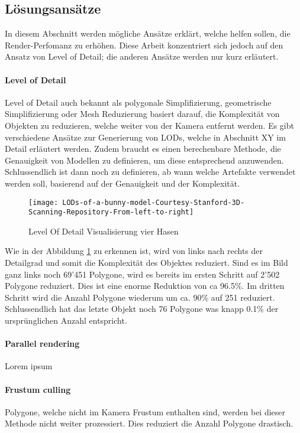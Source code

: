 \subsection{Lösungsansätze}
In diesem Abschnitt werden mögliche Ansätze erklärt, welche helfen sollen, die Render-Perfomanz zu erhöhen. Diese Arbeit konzentriert sich jedoch auf den Ansatz von Level of Detail; die anderen Ansätze werden nur kurz erläutert.

\paragraph{Level of Detail}
Level of Detail auch bekannt als polygonale Simplifizierung, geometrische Simplifizierung oder Mesh Reduzierung basiert darauf, die Komplexität von Objekten zu reduzieren, welche weiter von der Kamera entfernt werden. Es gibt verschiedene Ansätze zur Generierung von LODs, welche in Abschnitt XY im Detail erläutert werden. Zudem braucht es einen berechenbare Methode, die Genauigkeit von Modellen zu definieren, um diese entsprechend anzuwenden. Schlussendlich ist dann noch zu definieren, ab wann welche Artefakte verwendet werden soll, basierend auf der Genauigkeit und der Komplexität.

\begin{figure}[H]
\centering
\texttt{[image: LODs-of-a-bunny-model-Courtesy-Stanford-3D-Scanning-Repository-From-left-to-right]}
\caption{Level Of Detail Visualisierung vier Hasen}
\label{fig:LevelOfDetailVisualisierungvierHasen}
\end{figure}

Wie in der Abbildung \ref{fig:LevelOfDetailVisualisierungvierHasen} zu erkennen ist, wird von links nach rechts der Detailgrad und somit die Komplexität des Objektes reduziert. Sind es im Bild ganz links noch 69'451 Polygone, wird es bereits im ersten Schritt auf 2'502 Polygone reduziert. Dies ist eine enorme Reduktion von ca 96.5\%. Im dritten Schritt wird die Anzahl Polygone wiederum um ca. 90\% auf 251 reduziert. Schlussendlich hat das letzte Objekt noch 76 Polygone was knapp 0.1\% der ursprünglichen Anzahl entspricht.

\paragraph{Parallel rendering}
Lorem ipsum

\paragraph{Frustum culling}
Polygone, welche nicht im Kamera Frustum enthalten sind, werden bei dieser Methode nicht weiter prozessiert.
Dies reduziert die Anzahl Polygone drastisch.

